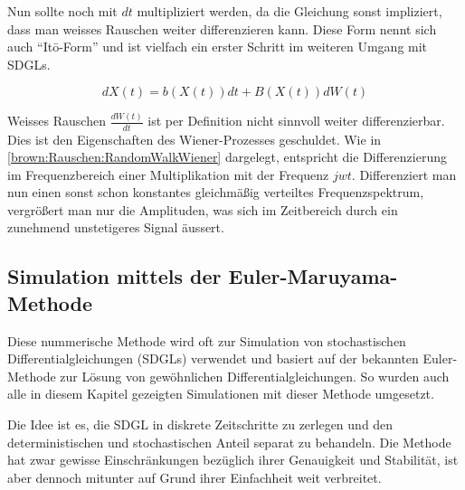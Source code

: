 Nun sollte noch mit $ dt $  multipliziert werden, da die Gleichung sonst impliziert, dass man weisses Rauschen weiter differenzieren kann. Diese Form nennt sich auch ``Itō-Form'' und ist vielfach ein erster Schritt im weiteren Umgang mit SDGLs.

\begin{equation}
	dX(t) = b(X(t)) dt + B(X(t)) dW(t)
\end{equation}

Weisses Rauschen $ \frac{dW(t)}{dt} $ ist per Definition nicht sinnvoll weiter differenzierbar. Dies ist den Eigenschaften des Wiener-Prozesses geschuldet. Wie in \ref{brown:Rauschen:RandomWalkWiener} dargelegt, entspricht die Differenzierung im Frequenzbereich einer Multiplikation mit der Frequenz $ jwt $. Differenziert man nun einen sonst schon konstantes gleichmäßig verteiltes Frequenzspektrum, vergrößert man nur die Amplituden, was sich im Zeitbereich durch ein zunehmend unstetigeres Signal äussert.



\subsection{Simulation mittels der Euler-Maruyama-Methode\label{brown:Simulation}}

Diese nummerische Methode wird oft zur Simulation von stochastischen Differentialgleichungen (SDGLs) verwendet und basiert auf der bekannten Euler-Methode zur Lösung von gewöhnlichen Differentialgleichungen. So wurden auch alle in diesem Kapitel gezeigten Simulationen mit dieser Methode umgesetzt. 

Die Idee ist es, die SDGL in diskrete Zeitschritte zu zerlegen und den deterministischen und stochastischen Anteil separat zu behandeln. Die Methode hat zwar gewisse Einschränkungen bezüglich ihrer Genauigkeit und Stabilität, ist aber dennoch mitunter auf Grund ihrer Einfachheit weit verbreitet.




